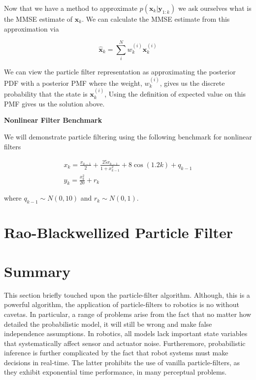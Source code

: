 Now that we have a method to approximate $p(\mathbf{x}_k | \mathbf{y}_{1:k})$ we ask ourselves what is the MMSE estimate of $\mathbf{x}_k$.
We can  calculate the MMSE estimate from this approximation via

\begin{equation}
\hat{\mathbf{x}}_k = \sum_{i}^{N} w_{k}^{(i)} \mathbf{x}_{k}^{(i)}
\end{equation}

We can view the particle filter representation as approximating the posterior PDF with a posterior PMF where the weight, $w_{k}^{(i)}$, 
gives us the discrete probability that the state is $\mathbf{x}_{k}^{(i)}$, Using the definition of expected value on this PMF gives us the solution above.


\begin{framed}
\begin{exmp}{\textbf{Nonlinear Filter Benchmark}}

We will demonstrate particle filtering using the following benchmark for nonlinear filters

\begin{eqnarray}
x_k = \frac{x_{k-1}}{2} + \frac{25x_{k-1}}{1 + x_{k-1}^2} + 8 \cos(1.2k) + q_{k-1} \\
y_k = \frac{x_{k}^2}{20} + r_k
\end{eqnarray}

where $q_{k-1}\sim N(0,10)$ and $r_k \sim N(0,1)$.
\end{exmp}
\end{framed}

\section{Rao-Blackwellized Particle Filter}
\label{rao_blackwellized_particle_filter}


\section{Summary}
This section briefly touched upon the particle-filter algorithm. Although, this is a powerful algorithm, the application
of particle-filters to robotics is no without cavetas. In particular, a range of problems arise from the fact that no
matter how detailed the probabilistic model, it will still be wrong and make false independence assumptions. In robotics,
all models lack important state variables that systematically affect sensor and actuator noise. Furtheremore, 
probabilistic inference is further complicated by the fact that robot systems must make decisions in real-time. The latter 
prohibits the use of vanilla particle-filters, as they exhibit exponential time performance, in many perceptual problems.


